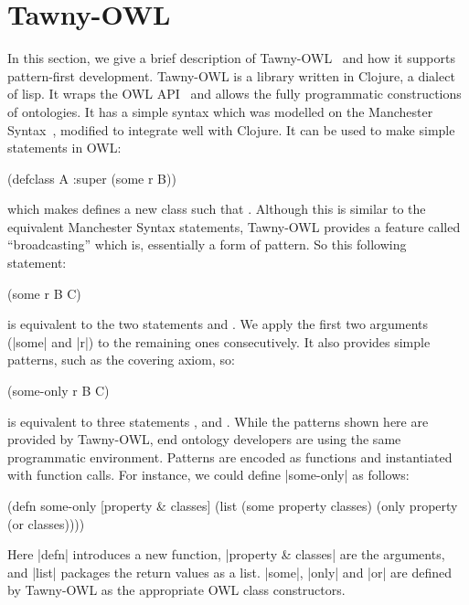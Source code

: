 \documentclass{icbo}
\newcommand{\tawny}{Tawny-OWL\xspace}
\begin{document}
\section{\tawny}
\label{sec:tawny}

In this section, we give a brief description of \tawny~\citep{tawny}
and how it supports pattern-first development. \tawny is a library
written in Clojure, a dialect of lisp. It wraps the OWL
API~\citep{owlapi} and allows the fully programmatic constructions of
ontologies. It has a simple syntax which was modelled on the
Manchester Syntax~\citep{ms2}, modified to integrate well with
Clojure. It can be used to make simple statements in OWL:

\begin{tcode}
(defclass A :super (some r B))
\end{tcode}

which makes defines a new class  such that
. Although this is similar to the equivalent
Manchester Syntax statements, \tawny provides a feature called
``broadcasting'' which is, essentially a form of pattern. So this
following statement:

\begin{tcode}
(some r B C)
\end{tcode}

is equivalent to the two statements  and
. We apply the first two arguments (|some| and |r|) to
the remaining ones consecutively.  It also provides simple patterns,
such as the covering axiom, so:

\begin{tcode}
(some-only r B C)
\end{tcode}

is equivalent to three statements ,  and
. While the patterns shown here are provided
by \tawny, end ontology developers are using the same programmatic
environment.  Patterns are encoded as functions and instantiated with
function calls. For instance, we could define |some-only| as follows:

\begin{tcode}
(defn some-only [property & classes]
 (list (some property classes)
       (only property
             (or classes))))
\end{tcode}
           
Here |defn| introduces a new function, |property & classes| are the
arguments, and |list| packages the return values as a list. |some|,
|only| and |or| are defined by \tawny as the appropriate OWL class
constructors.
\end{document}
